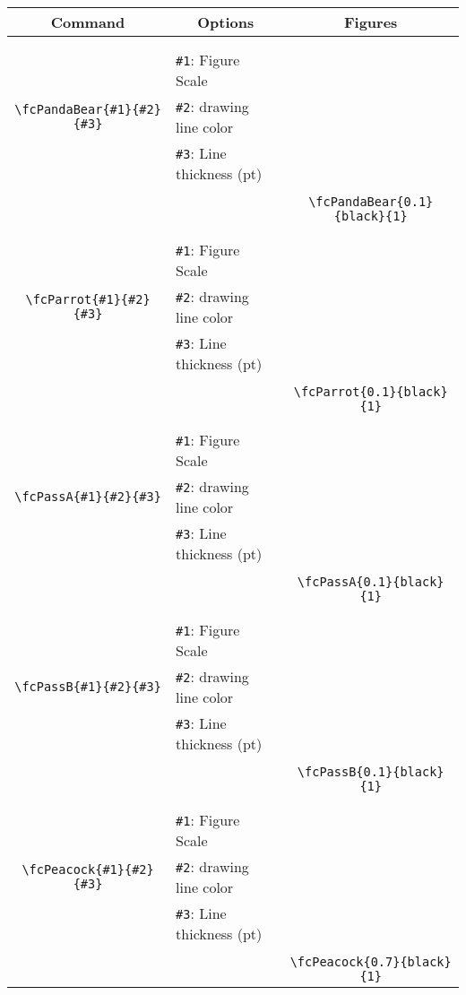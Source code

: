\documentclass[x11names]{article}
\begin{document}
\begin{table}[H]\centering\begin{tabular}{|c|l|c|}\hline {\bf Command}& \multicolumn{1}{c|}{{\bf Options}} & {\bf Figures}\\  \hline	&&\multirow{5}{*}{\fcPandaBear{0.1}{black}{1}}\\	&&\\	&\verb|#1|: Figure Scale &\\	\verb|\fcPandaBear{#1}{#2}{#3}|&	\verb|#2|: drawing line color &\\	&\verb|#3|: Line thickness (pt) &\\ &&\\&&	\verb|\fcPandaBear{0.1}{black}{1}|\\\hline 	
	&&\multirow{5}{*}{\fcParrot{0.1}{black}{1}}\\	&&\\	&\verb|#1|: Figure Scale &\\	\verb|\fcParrot{#1}{#2}{#3}|&	\verb|#2|: drawing line color &\\	&\verb|#3|: Line thickness (pt) &\\ &&\\&&	\verb|\fcParrot{0.1}{black}{1}|\\\hline 	
	&&\multirow{5}{*}{\fcPassA{0.1}{black}{1}}\\	&&\\	&\verb|#1|: Figure Scale &\\	\verb|\fcPassA{#1}{#2}{#3}|&	\verb|#2|: drawing line color &\\	&\verb|#3|: Line thickness (pt) &\\ &&\\&&	\verb|\fcPassA{0.1}{black}{1}|\\\hline 	
	&&\multirow{5}{*}{\fcPassB{0.1}{black}{1}}\\	&&\\	&\verb|#1|: Figure Scale &\\	\verb|\fcPassB{#1}{#2}{#3}|&	\verb|#2|: drawing line color &\\	&\verb|#3|: Line thickness (pt) &\\ &&\\&&	\verb|\fcPassB{0.1}{black}{1}|\\\hline 	
	&&\multirow{5}{*}{\fcPeacock{0.7}{black}{1}}\\	&&\\	&\verb|#1|: Figure Scale &\\	\verb|\fcPeacock{#1}{#2}{#3}|&	\verb|#2|: drawing line color &\\	&\verb|#3|: Line thickness (pt) &\\ &&\\&&	\verb|\fcPeacock{0.7}{black}{1}|\\\hline 	

\end{tabular}
\end{table}
\end{document}
